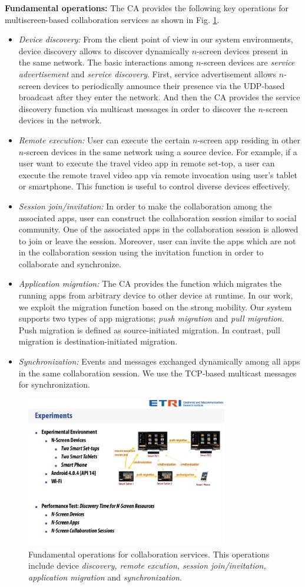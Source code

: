 \documentclass[conference]{IEEEtran}
\newcommand{\bi}{\begin{itemize}}
\newcommand{\ei}{\end{itemize}}
\newcommand{\ii}{\item}
\begin{document}
\noindent
\textbf{Fundamental operations:} 
The CA provides the following key operations for multiscreen-based collaboration services as shown in Fig. \ref{fig:operations}. 
\bi
\ii  \textit{Device discovery:} From the client point of view in our system environments, device discovery allows to discover dynamically $n$-screen devices present in  the same network.
The basic interactions among $n$-screen devices are \textit{service advertisement} and \textit{service discovery}.
First, service advertisement allows $n$-screen devices to periodically announce their presence  via the UDP-based broadcast after they enter the network.  
And then the CA provides the service discovery function via multicast messages in order to discover the $n$-screen devices in the network.
\ii \textit{Remote execution:} User can execute the certain $n$-screen app residing in other $n$-screen devices in the same network using a source device.
For example, if  a user want to execute the travel video app in remote set-top, a user can execute the remote travel video app via remote invocation using user's tablet or smartphone. This function is useful to control diverse devices effectively.
\ii  \textit{Session join/invitation:} In order to make the collaboration among the associated apps, user can construct the collaboration session similar to social community. One of the associated apps in the collaboration session is allowed to join or leave the session. Moreover, user can invite the apps which are not in the collaboration session using the invitation function in order to collaborate and synchronize.
\ii \textit{Application migration:}  The CA provides the function which migrates the running apps from arbitrary device to other device at runtime. In our work, we exploit the migration function based on the strong mobility. Our system supports two types of app migrations; \textit{push migration}  and \textit{pull migration}. Push migration is defined as source-initiated migration. In contrast, pull migration is destination-initiated migration. 
\ii \textit{Synchronization:} Events and messages exchanged dynamically among all apps in the same collaboration session. We use the TCP-based multicast messages for synchronization.
\ei

 \begin{figure}[htb] 
 \centering
 \includegraphics[width=8.8cm,keepaspectratio]{concepts}
 \caption{Fundamental operations for collaboration services. This operations include device \textit{discovery, remote excution, session join/invitation, application migration} and  \textit{synchronization}.}
 \label{fig:operations}
 \end{figure}
\end{document}
